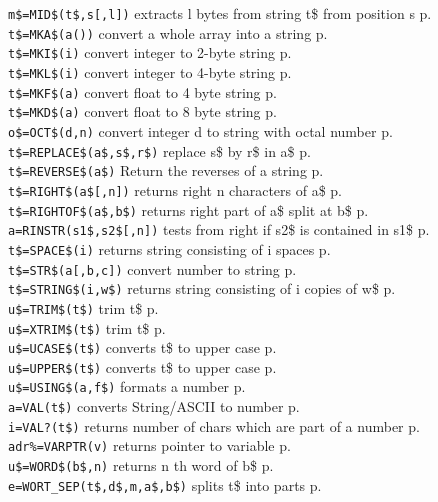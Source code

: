 \begin{tabbing}
\verb|m$=MID$(t$,s[,l])| \>extracts l bytes from string t\$ from position s \> p.\pageref{MIDS}\\
\verb|t$=MKA$(a())| \>	convert a whole array into a string\> p.\pageref{MKAS}\\
\verb|t$=MKI$(i)| \>	convert integer to 2-byte string\> p.\pageref{MKIS}\\
\verb|t$=MKL$(i)| \>	convert integer to 4-byte string\> p.\pageref{MKLS}\\
\verb|t$=MKF$(a)| \>	convert float to 4 byte string\> p.\pageref{MKFS}\\
\verb|t$=MKD$(a)| \>	convert float to 8 byte string\> p.\pageref{MKDS}\\
\verb|o$=OCT$(d,n)| \>     convert integer d to string with octal number\> p.\pageref{OCTS}\\
\verb|t$=REPLACE$(a$,s$,r$)| \>  replace s\$ by r\$ in a\$\> p.\pageref{REPLACES}\\
\verb|t$=REVERSE$(a$)| \>  Return the reverses of a string\> p.\pageref{REVERSES}\\
\verb|t$=RIGHT$(a$[,n])| \>  returns right n characters of a\$\> p.\pageref{RIGHTS}\\
\verb|t$=RIGHTOF$(a$,b$)| \>  returns right part of a\$ split at b\$\> p.\pageref{RIGHTOFS}\\
\verb|a=RINSTR(s1$,s2$[,n])| \>  tests from right if s2\$ is contained in s1\$\> p.\pageref{RINSTR}\\
\verb|t$=SPACE$(i)| \>	     returns string consisting of i spaces\> p.\pageref{SPACES}\\
\verb|t$=STR$(a[,b,c])| \>convert number to string \> p.\pageref{STRS}\\
\verb|t$=STRING$(i,w$)| \>   returns string consisting of i copies of w\$\> p.\pageref{STRINGS}\\
\verb|u$=TRIM$(t$)| \>	     trim t\$ \> p.\pageref{TRIMS}\\
\verb|u$=XTRIM$(t$)| \>	     trim t\$ \> p.\pageref{XTRIMS}\\
\verb|u$=UCASE$(t$)| \>	     converts t\$ to upper case\> p.\pageref{UCASES}\\
\verb|u$=UPPER$(t$)| \>	     converts t\$ to upper case\> p.\pageref{UPPERS}\\
\verb|u$=USING$(a,f$)| \> formats a number \> p.\pageref{USINGS}\\
\verb|a=VAL(t$)| \> converts String/ASCII to number\> p.\pageref{VAL}\\
\verb|i=VAL?(t$)| \>returns number of chars which are part of a number\> p.\pageref{VALf}\\
\verb|adr%=VARPTR(v)| \>returns pointer to variable\> p.\pageref{VARPTR}\\
\verb|u$=WORD$(b$,n)| \>     returns n th word of b\$\> p.\pageref{WORDS}\\
\verb|e=WORT_SEP(t$,d$,m,a$,b$)| \> splits t\$ into parts\> p.\pageref{WORT_SEP}\\
\end{tabbing}


